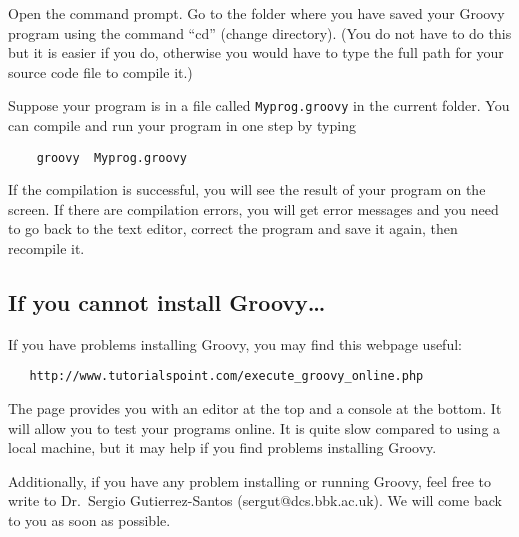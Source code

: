 Open the command prompt. 
Go to the folder where you have saved your Groovy
program using the command ``cd'' (change directory). (You do not have to
do this but it is easier if you do, otherwise you would have to type the full
path for your source code file to compile it.)

Suppose your program is in a file called 
\texttt{Myprog.groovy} in the current folder. 
You can compile and run your program in one step by typing 

\begin{Verbatim}
    groovy  Myprog.groovy
\end{Verbatim}

If the compilation is successful, you will see the result of your
program on the screen.
%
If there are compilation errors, you will get error messages and you need
to go back to the text editor, correct the program and save it again,
then recompile it. 



\subsection*{If you cannot install Groovy\ldots}
\label{sec:if-you-cannot}

If you have problems installing Groovy, you may find this webpage useful:

\begin{verbatim}
   http://www.tutorialspoint.com/execute_groovy_online.php
\end{verbatim}

The page provides you with an editor at the top and a console at the
bottom. It will allow you to test your programs online. It is quite
slow compared to using a local machine, but it may help if you find
problems installing Groovy. 

Additionally, if you have any problem installing or running Groovy,
feel free to write to Dr.\ Sergio Gutierrez-Santos
(sergut@dcs.bbk.ac.uk). We will come back to you as soon as possible.


